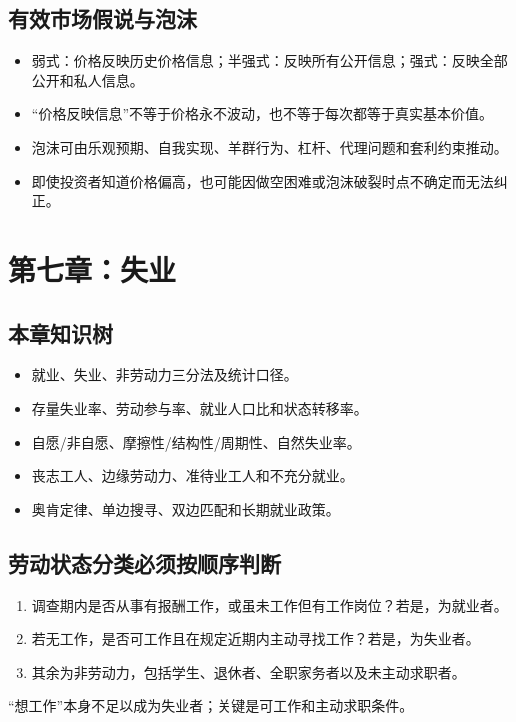 \documentclass[UTF8,11pt,a4paper]{ctexart}
\begin{document}
\subsection{有效市场假说与泡沫}
\begin{itemize}
  \item 弱式：价格反映历史价格信息；半强式：反映所有公开信息；强式：反映全部公开和私人信息。
  \item “价格反映信息”不等于价格永不波动，也不等于每次都等于真实基本价值。
  \item 泡沫可由乐观预期、自我实现、羊群行为、杠杆、代理问题和套利约束推动。
  \item 即使投资者知道价格偏高，也可能因做空困难或泡沫破裂时点不确定而无法纠正。
\end{itemize}

\newpage
\section{第七章：失业}

\subsection{本章知识树}
\begin{itemize}
  \item 就业、失业、非劳动力三分法及统计口径。
  \item 存量失业率、劳动参与率、就业人口比和状态转移率。
  \item 自愿/非自愿、摩擦性/结构性/周期性、自然失业率。
  \item 丧志工人、边缘劳动力、准待业工人和不充分就业。
  \item 奥肯定律、单边搜寻、双边匹配和长期就业政策。
\end{itemize}

\subsection{劳动状态分类必须按顺序判断}
\begin{methodbox}[分类顺序]
\begin{enumerate}
  \item 调查期内是否从事有报酬工作，或虽未工作但有工作岗位？若是，为就业者。
  \item 若无工作，是否可工作且在规定近期内主动寻找工作？若是，为失业者。
  \item 其余为非劳动力，包括学生、退休者、全职家务者以及未主动求职者。
\end{enumerate}
“想工作”本身不足以成为失业者；关键是可工作和主动求职条件。
\end{methodbox}
\end{document}
